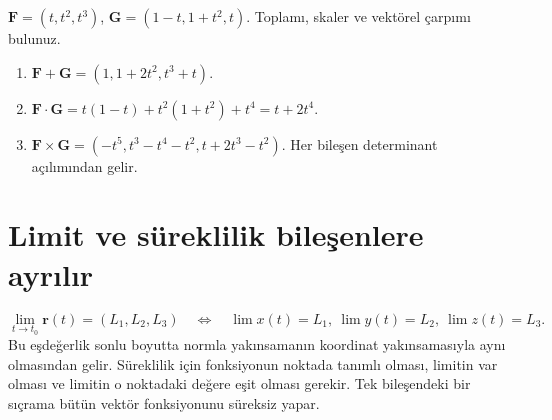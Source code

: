 \begin{tcolorbox}[title={Örnek 3.2 | Vektör fonksiyonlarıyla işlemler},colframe=accent]\(\mathbf F=(t,t^2,t^3)\), \(\mathbf G=(1-t,1+t^2,t)\). Toplamı, skaler ve vektörel çarpımı bulunuz.
\par{}\end{tcolorbox}
\begin{tcolorbox}[title={Adım adım çözüm},colback=green!3!white,colframe=green]\begin{enumerate}
\item \(\mathbf F+\mathbf G=(1,1+2t^2,t^3+t)\).
\item \(\mathbf F\cdot\mathbf G=t(1-t)+t^2(1+t^2)+t^4=t+2t^4\).
\item \(\mathbf F\times\mathbf G=(-t^5,t^3-t^4-t^2,t+2t^3-t^2)\). Her bileşen determinant açılımından gelir.
\end{enumerate}\end{tcolorbox}
\section{Limit ve süreklilik bileşenlere ayrılır}

{\small\[
\lim_{t\to t_0}\mathbf r(t)=(L_1,L_2,L_3)\quad\Longleftrightarrow\quad\lim x(t)=L_1,\ \lim y(t)=L_2,\ \lim z(t)=L_3.
\]}
Bu eşdeğerlik sonlu boyutta normla yakınsamanın koordinat yakınsamasıyla aynı olmasından gelir. Süreklilik için fonksiyonun noktada tanımlı olması, limitin var olması ve limitin o noktadaki değere eşit olması gerekir. Tek bileşendeki bir sıçrama bütün vektör fonksiyonunu süreksiz yapar.

